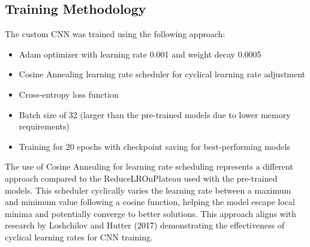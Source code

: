 \documentclass[a4paper,12pt]{article}
\begin{document}
\subsection{Training Methodology}

The custom CNN was trained using the following approach:

\begin{itemize}
    \item Adam optimizer with learning rate 0.001 and weight decay 0.0005
    \item Cosine Annealing learning rate scheduler for cyclical learning rate adjustment
    \item Cross-entropy loss function
    \item Batch size of 32 (larger than the pre-trained models due to lower memory requirements)
    \item Training for 20 epochs with checkpoint saving for best-performing models
\end{itemize}

The use of Cosine Annealing for learning rate scheduling represents a different approach compared to the ReduceLROnPlateau used with the pre-trained models. This scheduler cyclically varies the learning rate between a maximum and minimum value following a cosine function, helping the model escape local minima and potentially converge to better solutions. This approach aligns with research by Loshchilov and Hutter (2017) demonstrating the effectiveness of cyclical learning rates for CNN training.



\newpage


\end{document}
